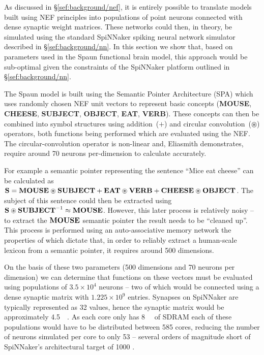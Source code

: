 \documentclass[conference]{IEEEtran}
\newcommand{\semanticpointer}{\textbf}
\newcommand{\msemanticpointer}[1]{\mbox{\semanticpointer{#1}}}
\begin{document}
As discussed in \S\ref{sef:background/nef}, it is entirely possible to translate models built using NEF principles into populations of point neurons connected with dense synaptic weight matrices.
These networks could then, in theory, be simulated using the standard SpiNNaker spiking neural network simulator described in \S\ref{sef:background/nn}.
In this section we show that, based on parameters used in the Spaun functional brain model, this approach would be sub-optimal given the constraints of the SpiNNaker platform outlined in \S\ref{sef:background/nn}.

The Spaun model is built using the Semantic Pointer Architecture (SPA) \parencite{eliasmith2013build} which uses randomly chosen NEF unit vectors to represent basic concepts (\semanticpointer{MOUSE}, \semanticpointer{CHEESE}, \semanticpointer{SUBJECT}, \semanticpointer{OBJECT}, \semanticpointer{EAT}, \semanticpointer{VERB}).
These concepts can then be combined into symbol structures using addition~($+$) and circular convolution~($\circledast$) operators, both functions being performed which are evaluated using the NEF.
The circular-convolution operator is non-linear and, Eliasmith \parencite{eliasmith2013build} demonstrates, require around 70 neurons per-dimension to calculate accurately.

For example a semantic pointer representing the sentence ``Mice eat cheese'' can be calculated as $\msemanticpointer{S} = \msemanticpointer{MOUSE} \circledast \msemanticpointer{SUBJECT} + \msemanticpointer{EAT} \circledast \msemanticpointer{VERB} + \msemanticpointer{CHEESE} \circledast \msemanticpointer{OBJECT}$.
The subject of this sentence could then be extracted using $\msemanticpointer{S} \circledast \msemanticpointer{SUBJECT}^{-1} \approx \msemanticpointer{MOUSE}$.
However, this later process is relatively noisy -- to extract the $\msemanticpointer{MOUSE}$ semantic pointer the result needs to be ``cleaned up''.
This process is performed using an auto-associative memory network \parencite{Stewart2011} the properties of which dictate that, in order to reliably extract a human-scale lexicon from a semantic pointer, it requires around 500 dimensions.

On the basis of these two parameters (500 dimensions and 70 neurons per dimension) we can determine that functions on these vectors must be evaluated using populations of $3.5\times10^4$ neurons -- two of which would be connected using a dense synaptic matrix with $1.225\times10^9$ entries.
Synapses on SpiNNaker are typically represented as \SI{32}{\bit} values, hence the synaptic matrix would be approximately \SI{4.5}{\gibi\byte}.
As each core only has \SI{8}{\mebi\byte} of SDRAM each of these populations would have to be distributed between 585 cores, reducing the number of neurons simulated per core to only 53 -- several orders of magnitude short of SpiNNaker's architectural target of 1000 \parencite{}. 
\end{document}
